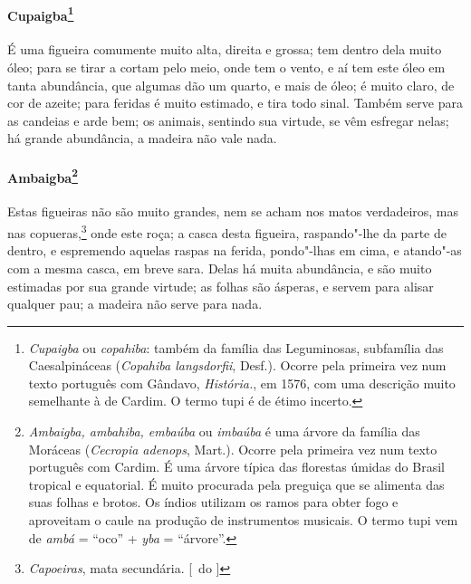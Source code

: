 \paragraph{Cupaigba\footnote{ \textit{Cupaigba} ou \textit{copahiba}: 
também da família das Leguminosas, subfamília das Caesalpináceas
(\textit{Copahiba langsdorfii}, Desf.). Ocorre pela primeira vez num
texto português com Gândavo, \textit{História.}, em 1576, com uma
descrição muito semelhante à de Cardim. O termo tupi é de étimo
incerto.}} É uma figueira comumente muito alta, direita e
grossa; tem dentro dela muito óleo; para se tirar a cortam pelo meio,
onde tem o vento, e aí tem este óleo em tanta abundância, que algumas
dão um quarto, e mais de óleo; é muito claro, de cor de azeite; para
feridas é muito estimado, e tira todo sinal. Também serve para as
candeias e arde bem; os animais, sentindo sua virtude, se vêm esfregar
nelas; há grande abundância, a madeira não vale nada.

\paragraph{Ambaigba\footnote{ \textit{Ambaigba, ambahiba, embaúba} ou
 \textit{imbaúba} é uma árvore da família das Moráceas
(\textit{Cecropia adenops}, Mart.). Ocorre pela primeira vez num texto
português com Cardim. É uma árvore típica das florestas úmidas do
Brasil tropical e equatorial. É muito procurada pela preguiça que se
alimenta das suas folhas e brotos. Os índios utilizam os ramos para
obter fogo e aproveitam o caule na produção de instrumentos musicais. O
termo tupi vem de \textit{ambá} = ``oco'' + \textit{yba} = ``árvore''.}} 
Estas figueiras não são muito grandes, nem se
acham nos matos verdadeiros, mas nas copueras,\footnote{ \textit{Capoeiras}, mata secundária. [~do ]} onde este roça; a casca 
desta figueira, raspando"-lhe da parte de dentro, e espremendo aquelas
raspas na ferida, pondo"-lhas em cima, e atando"-as com a mesma casca,
em breve sara. Delas há muita abundância, e são muito estimadas por sua
grande virtude; as folhas são ásperas, e servem para alisar qualquer
pau; a madeira não serve para nada.

